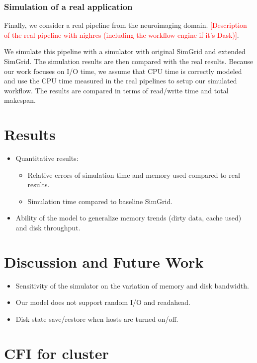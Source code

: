 \documentclass[conference]{IEEEtran}
\begin{document}
		    \subsubsection{Simulation of a real application}

		    Finally, we consider a real pipeline from the neuroimaging domain. 			
			\textcolor{red}{[Description of the real pipeline with nighres 
			(including the workflow engine if it's Dask)]}.  			
			
			We simulate this pipeline with a simulator with original SimGrid and 
			extended SimGrid. 
			The simulation results are then compared with the real results. 
			Because our work focuses on I/O time, we assume that CPU time is 
			correctly modeled and use the CPU time measured in the real pipelines 
			to setup our simulated workflow. The results are compared in terms of 
			read/write time and total makespan.

	\section{Results}
	
		\begin{itemize}

			\item Quantitative results: 
				\begin{itemize}
					\item Relative errors of simulation time and memory used compared to real results.
					\item Simulation time compared to baseline SimGrid.
				\end{itemize} 

			\item Ability of the model to generalize memory trends (dirty data, cache used) and disk throughput.

		\end{itemize}

	\section{Discussion and Future Work}
		\begin{itemize}
			\item Sensitivity of the simulator on the variation of memory and disk bandwidth. 
			\item Our model does not support random I/O and readahead.
			\item Disk state save/restore when hosts are turned on/off.
		\end{itemize}
	\section{CFI for cluster}


\end{document}
